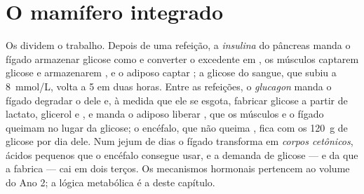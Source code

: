 \section{O mamífero integrado}

\begin{proposition}\label{prop:b1:biosyntheses-integration:fedfasting}
Os  dividem o trabalho. Depois de uma refeição, a
\emph{insulina} do pâncreas manda o fígado armazenar glicose como
 e converter o excedente em , os músculos captarem
glicose e armazenarem , e o  adiposo captar ; a
glicose do sangue, que subiu a \qty{8}{mmol/L}, volta a \qty{5}{} em
duas horas. Entre as refeições, o \emph{glucagon} manda o fígado
degradar o  dele e, à medida que ele se esgota, fabricar
glicose a partir de lactato, glicerol e , e manda o 
adiposo liberar , que os músculos e o fígado queimam no
lugar da glicose; o encéfalo, que não queima , fica com os
\qty{120}{g} de glicose por dia dele. Num jejum de dias o fígado
transforma  em \emph{corpos cetônicos}, ácidos pequenos que
o encéfalo consegue usar, e a demanda de glicose --- e da  que a
fabrica --- cai em dois terços. Os mecanismos hormonais pertencem ao
volume do Ano 2; a lógica metabólica é a deste capítulo.
\end{proposition}

